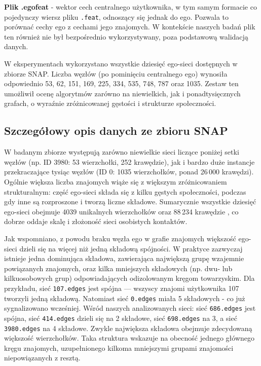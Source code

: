\textbf{Plik .egofeat} - wektor cech centralnego użytkownika, w tym samym formacie co pojedynczy wiersz pliku \verb|.feat|, odnoszący się jednak do ego. Pozwala to porównać cechy ego z cechami jego znajomych. W kontekście naszych badań plik ten również nie był bezpośrednio wykorzystywany, poza podstawową walidacją danych.

W eksperymentach wykorzystano wszystkie dziesięć ego-sieci dostępnych w zbiorze SNAP. Liczba węzłów (po pominięciu centralnego ego) wynosiła odpowiednio 53, 62, 151, 169, 225, 334, 535, 748, 787 oraz 1035. Zestaw ten umożliwił ocenę algorytmów zarówno na niewielkich, jak i ponadtysięcznych grafach, o wyraźnie zróżnicowanej gęstości i strukturze społeczności.

\subsection{Szczegółowy opis danych ze zbioru SNAP}
W badanym zbiorze występują zarówno niewielkie sieci liczące poniżej setki węzłów (np. ID 3980: 53 wierzchołki, 252 krawędzie), jak i bardzo duże instancje przekraczające tysiąc węzłów (ID 0: 1035 wierzchołków, ponad 26\,000 krawędzi). Ogólnie większa liczba znajomych wiąże się z większym zróżnicowaniem strukturalnym: część ego-sieci składa się z kilku gęstych społeczności, podczas gdy inne są rozproszone i tworzą liczne składowe. Sumarycznie wszystkie dziesięć ego-sieci obejmuje 4039 unikalnych wierzchołków oraz 88\,234 krawędzie \cite{McAuley2012}, co dobrze oddaje skalę i złożoność sieci osobistych kontaktów.

Jak wspomniano, z powodu braku węzła ego w grafie znajomych większość ego-sieci dzieli się na więcej niż jedną składową spójności. W praktyce zazwyczaj istnieje jedna dominująca składowa, zawierająca największą grupę wzajemnie powiązanych znajomych, oraz kilka mniejszych składowych (np. dwu- lub kilkuosobowych grup) odpowiadających odizolowanym kręgom towarzyskim. Dla przykładu, sieć \verb|107.edges| jest spójna — wszyscy znajomi użytkownika 107 tworzyli jedną składową. Natomiast sieć \verb|0.edges| miała 5 składowych - co już sygnalizowano wcześniej. Wśród naszych analizowanych sieci: sieć \verb|686.edges| jest spójna, sieć \verb|414.edges| dzieli się na 2 składowe, sieć \verb|698.edges| na 3, a sieć \verb|3980.edges| na 4 składowe. Zwykle największa składowa obejmuje zdecydowaną większość wierzchołków. Taka struktura wskazuje na obecność jednego głównego kręgu znajomych, uzupełnionego kilkoma mniejszymi grupami znajomości niepowiązanych z resztą.

